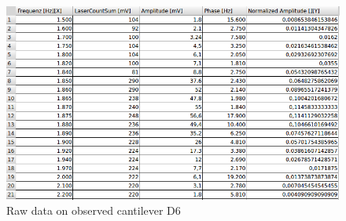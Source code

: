 \documentclass[12pt,a4paper]{article}
\begin{document}
\begin{figure}[H]
	\centering
	\includegraphics[scale=0.5]{../figures/rohdaten.png}
	\caption{Raw data on observed cantilever D6}
	\label{fig:resonanzkurvedata}
\end{figure}
\end{document}
